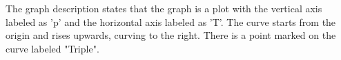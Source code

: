 The graph description states that the graph is a plot with the vertical axis labeled as 'p' and the horizontal axis labeled as 'T'. The curve starts from the origin and rises upwards, curving to the right. There is a point marked on the curve labeled "Triple".